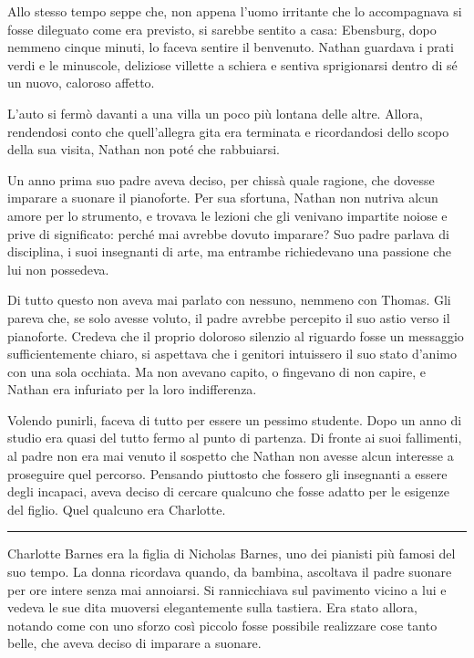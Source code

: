 \documentclass[a4paper,oneside,11pt]{memoir}
\begin{document}
Allo stesso tempo seppe che, non appena l'uomo irritante che lo accompagnava si fosse dileguato come era previsto, si
sarebbe sentito a casa: Ebensburg, dopo nemmeno cinque minuti, lo faceva sentire il benvenuto. Nathan guardava i prati
verdi e le minuscole, deliziose villette a schiera e sentiva sprigionarsi dentro di sé un nuovo, caloroso affetto.

L'auto si fermò davanti a una villa un poco più lontana delle altre. Allora, rendendosi conto che quell'allegra gita
era terminata e ricordandosi dello scopo della sua visita, Nathan non poté che rabbuiarsi.

Un anno prima suo padre aveva deciso, per chissà quale ragione, che dovesse imparare a suonare il pianoforte. Per sua
sfortuna, Nathan non nutriva alcun amore per lo strumento, e trovava le lezioni che gli venivano impartite noiose e
prive di significato: perché mai avrebbe dovuto imparare? Suo padre parlava di disciplina, i suoi insegnanti di arte,
ma entrambe richiedevano una passione che lui non possedeva.

Di tutto questo non aveva mai parlato con nessuno, nemmeno con Thomas. Gli pareva che, se solo avesse voluto, il padre
avrebbe percepito il suo astio verso il pianoforte. Credeva che il proprio doloroso silenzio al riguardo fosse un
messaggio sufficientemente chiaro, si aspettava che i genitori intuissero il suo stato d'animo con una sola occhiata. Ma
non avevano capito, o fingevano di non capire, e Nathan era infuriato per la loro indifferenza.

Volendo punirli, faceva di tutto per essere un pessimo studente. Dopo un anno di studio era quasi del tutto fermo al
punto di partenza. Di fronte ai suoi fallimenti, al padre non era mai venuto il sospetto che Nathan non avesse alcun
interesse a proseguire quel percorso. Pensando piuttosto che fossero gli insegnanti a essere degli incapaci, aveva
deciso di cercare qualcuno che fosse adatto per le esigenze del figlio. Quel qualcuno era Charlotte.

\plainbreak{1}

Charlotte Barnes era la figlia di Nicholas Barnes, uno dei pianisti più famosi del suo tempo. La donna ricordava
quando, da bambina, ascoltava il padre suonare per ore intere senza mai annoiarsi. Si rannicchiava sul pavimento vicino
a lui e vedeva le sue dita muoversi elegantemente sulla tastiera. Era stato allora, notando come con uno sforzo così
piccolo fosse possibile realizzare cose tanto belle, che aveva deciso di imparare a suonare.
\end{document}
